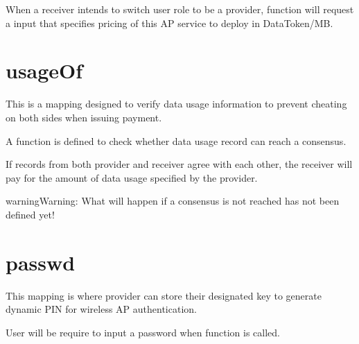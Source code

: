 \documentclass[letterpaper,10pt,english]{sphinxmanual}
\begin{document}
When a receiver intends to switch user role to be a provider,
function {\hyperref[\detokenize{index:surprovider}]{}} will request a input that specifies pricing of this AP service to deploy in DataToken/MB.


\section{usageOf}
\label{\detokenize{index:usageof}}
%
\begin{sphinxVerbatim}[commandchars=\\\{\}]
        
\end{sphinxVerbatim}

This is a mapping designed to verify data usage information to prevent cheating on both sides when issuing payment.

A function {\hyperref[\detokenize{index:tolerance}]{}} is defined to check whether data usage record can reach a consensus.

If records from both provider and receiver agree with each other, the receiver will pay for the amount of data usage specified by the provider.

\begin{sphinxadmonition}{warning}{Warning:}
What will happen if a consensus is not reached has not been defined yet!
\end{sphinxadmonition}


\section{passwd}
\label{\detokenize{index:passwd}}
%
\begin{sphinxVerbatim}[commandchars=\\\{\}]
     
\end{sphinxVerbatim}

This mapping is where provider can store their designated key to generate dynamic PIN for wireless AP authentication.

User will be require to input a password when function {\hyperref[\detokenize{index:surprovider}]{}} is called.
\end{document}
